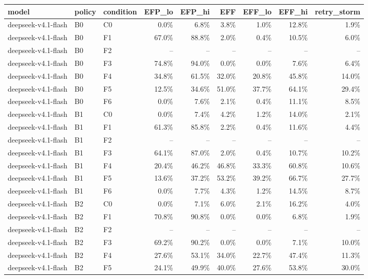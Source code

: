 \begin{tabular}{lllrrrrrr}
\toprule
model & policy & condition & EFP\_lo & EFP\_hi & EFF & EFF\_lo & EFF\_hi & retry\_storm \\
\midrule
deepseek-v4.1-flash & B0 & C0 & 0.0\% & 6.8\% & 3.8\% & 1.0\% & 12.8\% & 1.9\% \\
deepseek-v4.1-flash & B0 & F1 & 67.0\% & 88.8\% & 2.0\% & 0.4\% & 10.5\% & 6.0\% \\
deepseek-v4.1-flash & B0 & F2 & -- & -- & -- & -- & -- & -- \\
deepseek-v4.1-flash & B0 & F3 & 74.8\% & 94.0\% & 0.0\% & 0.0\% & 7.6\% & 6.4\% \\
deepseek-v4.1-flash & B0 & F4 & 34.8\% & 61.5\% & 32.0\% & 20.8\% & 45.8\% & 14.0\% \\
deepseek-v4.1-flash & B0 & F5 & 12.5\% & 34.6\% & 51.0\% & 37.7\% & 64.1\% & 29.4\% \\
deepseek-v4.1-flash & B0 & F6 & 0.0\% & 7.6\% & 2.1\% & 0.4\% & 11.1\% & 8.5\% \\
deepseek-v4.1-flash & B1 & C0 & 0.0\% & 7.4\% & 4.2\% & 1.2\% & 14.0\% & 2.1\% \\
deepseek-v4.1-flash & B1 & F1 & 61.3\% & 85.8\% & 2.2\% & 0.4\% & 11.6\% & 4.4\% \\
deepseek-v4.1-flash & B1 & F2 & -- & -- & -- & -- & -- & -- \\
deepseek-v4.1-flash & B1 & F3 & 64.1\% & 87.0\% & 2.0\% & 0.4\% & 10.7\% & 10.2\% \\
deepseek-v4.1-flash & B1 & F4 & 20.4\% & 46.2\% & 46.8\% & 33.3\% & 60.8\% & 10.6\% \\
deepseek-v4.1-flash & B1 & F5 & 13.6\% & 37.2\% & 53.2\% & 39.2\% & 66.7\% & 27.7\% \\
deepseek-v4.1-flash & B1 & F6 & 0.0\% & 7.7\% & 4.3\% & 1.2\% & 14.5\% & 8.7\% \\
deepseek-v4.1-flash & B2 & C0 & 0.0\% & 7.1\% & 6.0\% & 2.1\% & 16.2\% & 4.0\% \\
deepseek-v4.1-flash & B2 & F1 & 70.8\% & 90.8\% & 0.0\% & 0.0\% & 6.8\% & 1.9\% \\
deepseek-v4.1-flash & B2 & F2 & -- & -- & -- & -- & -- & -- \\
deepseek-v4.1-flash & B2 & F3 & 69.2\% & 90.2\% & 0.0\% & 0.0\% & 7.1\% & 10.0\% \\
deepseek-v4.1-flash & B2 & F4 & 27.6\% & 53.1\% & 34.0\% & 22.7\% & 47.4\% & 11.3\% \\
deepseek-v4.1-flash & B2 & F5 & 24.1\% & 49.9\% & 40.0\% & 27.6\% & 53.8\% & 30.0\% \\

\end{tabular}
